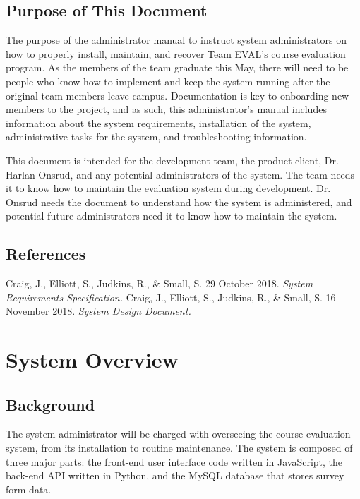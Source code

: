 \documentclass{article}
\begin{document}
\subsection{Purpose of This Document}

The purpose of the administrator manual to instruct system administrators on how to properly install, maintain, and recover Team EVAL's course evaluation program. As the members of the team graduate this May, there will need to be people who know how to implement and keep the system running after the original team members leave campus.  Documentation is key to onboarding new members to the project, and as such, this administrator's manual includes information about the system requirements, installation of the system, administrative tasks for the system, and troubleshooting information.

This document is intended for the development team, the product client, Dr. Harlan Onsrud, and any potential administrators of the system. The team needs it to know how to maintain the evaluation system during development. Dr. Onsrud needs the document to understand how the system is administered, and potential future administrators need it to know how to maintain the system.

\subsection{References}

Craig, J., Elliott, S., Judkins, R., \& Small, S. 29 October 2018. \textit{System Requirements Specification.}
\vspace{3mm}\newline
Craig, J., Elliott, S., Judkins, R., \& Small, S. 16 November 2018. \textit{System Design Document.}

\section{System Overview}

\subsection{Background}

The system administrator will be charged with overseeing the course evaluation system, from its installation to routine maintenance. The system is composed of three major parts: the front-end user interface code written in JavaScript, the back-end API written in Python, and the MySQL database that stores survey form data. 
\end{document}
